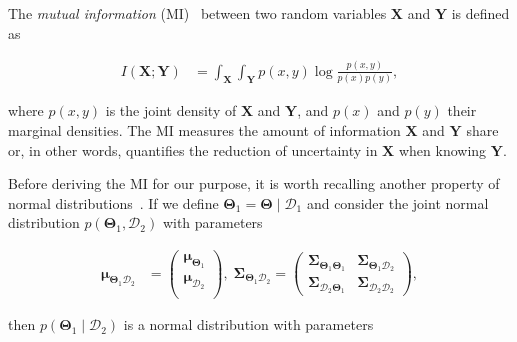 The \emph{mutual information} (MI)~\cite{mackay05information} between two random
variables $\mathbf{X}$ and $\mathbf{Y}$ is defined as

\begin{equation}\label{eqn:mi_definition}
  \begin{aligned}
  I(\mathbf{X};\mathbf{Y}) &=
    \int_{\mathbf{X}}\int_{\mathbf{Y}}p(x, y)\log\frac{p(x,y)}{p(x)p(y)},
  \end{aligned}
\end{equation}

\noindent where $p(x, y)$ is the joint density of $\mathbf{X}$ and $\mathbf{Y}$,
and $p(x)$ and $p(y)$ their marginal densities. The MI measures the amount of
information $\mathbf{X}$ and $\mathbf{Y}$ share or, in other words, quantifies
the reduction of uncertainty in $\mathbf{X}$ when knowing $\mathbf{Y}$.

Before deriving the MI for our purpose, it is worth recalling another property
of normal distributions~\cite{bishop06pattern}. If we define
$\mathbf{\Theta}_1=\mathbf{\Theta}\mid\mathcal{D}_1$ and consider the joint
normal distribution $p(\mathbf{\Theta}_1,\mathcal{D}_2)$ with parameters

\begin{equation}\label{eqn:joint_normal}
  \begin{aligned}
  \boldsymbol{\mu}_{\boldsymbol{\Theta}_1\mathcal{D}_2} &=
    \begin{pmatrix}
    \boldsymbol{\mu}_{\boldsymbol{\Theta}_1}\\
    \boldsymbol{\mu}_{\mathcal{D}_2}\\
    \end{pmatrix},\;
  \boldsymbol{\Sigma}_{\boldsymbol{\Theta}_1\mathcal{D}_2} =
    \begin{pmatrix}
    \boldsymbol{\Sigma}_{\boldsymbol{\Theta}_1\boldsymbol{\Theta}_1}&
    \boldsymbol{\Sigma}_{\boldsymbol{\Theta}_1\mathcal{D}_2}\\
    \boldsymbol{\Sigma}_{\mathcal{D}_2\boldsymbol{\Theta}_1}&
    \boldsymbol{\Sigma}_{\mathcal{D}_2\mathcal{D}_2}
    \end{pmatrix},
  \end{aligned}
\end{equation}

\noindent then $p(\mathbf{\Theta}_1\mid\mathcal{D}_2)$ is a normal distribution
with parameters

